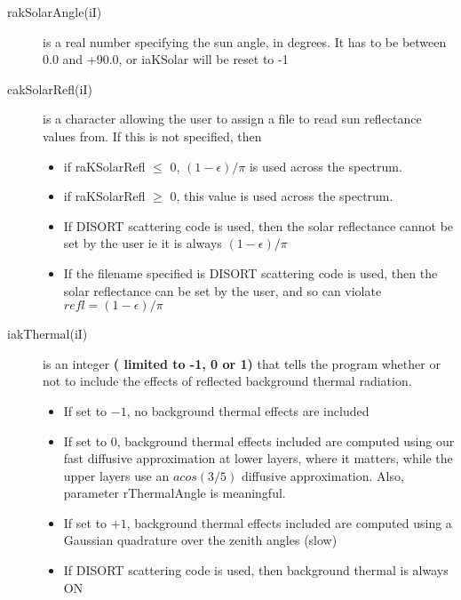 \documentclass[12pt]{article}
\begin{document}
{\begin{description}
\item[{\sf rakSolarAngle(iI)}] is a real number specifying the sun angle, in
degrees.  It has to be between 0.0 and +90.0, or iaKSolar will be reset to -1

\item[{\sf cakSolarRefl(iI)}] is a character allowing the user to assign a 
file to read sun reflectance values from. If this is not specified, then 
  \begin{itemize}
    \item if raKSolarRefl $\le$ 0, $(1-\epsilon)/\pi$ is used across the spectrum.
    \item if raKSolarRefl $\ge$ 0, this value is used across the spectrum.
  \end{itemize}
\begin{itemize}
\item If DISORT scattering code is used, then the solar reflectance cannot be
  set by the user ie it is always $(1-\epsilon)/\pi$ 
\item If the filename specified is DISORT scattering code is used, then the 
  solar reflectance can be set by the user, and so can violate
  $refl = (1-\epsilon)/\pi$ 
\end{itemize}

\item[{\sf iakThermal(iI)}] is an integer {\bf( limited to -1, 0 or 1)} that
tells the program whether or not to include the effects of reflected
background thermal radiation.
\begin{itemize}
\item If set to $-1$, no background thermal effects are included
\item If set to $0$, background thermal effects included are computed
  using our fast diffusive approximation at lower layers, where it
  matters, while the upper layers use an $acos(3/5)$ diffusive
  approximation.  Also, parameter {\sf rThermalAngle} is meaningful.
\item If set to $+1$, background thermal effects included are computed
  using a Gaussian quadrature over the zenith angles (slow)
\item If DISORT scattering code is used, then background thermal is always ON
\end{itemize}


\end{description}}
\end{document}
